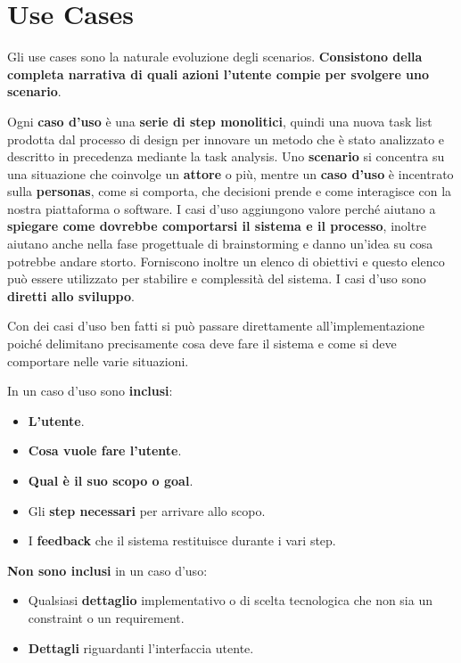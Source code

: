 \documentclass[a4paper,11pt,oneside]{book}
\begin{document}
\section{Use Cases}

Gli use cases sono la naturale evoluzione degli scenarios.
\textbf{Consistono della completa narrativa di quali azioni l'utente compie per svolgere uno scenario}.

Ogni \textbf{caso d'uso} è una \textbf{serie di step monolitici}, quindi una nuova task list prodotta dal processo di design per innovare un metodo che è stato analizzato e descritto in precedenza mediante la task analysis.
Uno \textbf{scenario} si concentra su una situazione che coinvolge un \textbf{attore} o più, mentre un
\textbf{caso d'uso} è incentrato sulla \textbf{personas}, come si comporta, che decisioni prende e come interagisce con la nostra piattaforma o software. I casi d'uso aggiungono valore perché aiutano a \textbf{spiegare come dovrebbe comportarsi
	il sistema e il processo}, inoltre aiutano anche nella fase progettuale di brainstorming e danno un'idea su cosa potrebbe andare storto. Forniscono inoltre un elenco di obiettivi e questo elenco può essere utilizzato per stabilire e complessità del sistema. I casi d'uso sono \textbf{diretti allo sviluppo}.

Con dei casi d'uso ben fatti si può passare direttamente all'implementazione poiché delimitano precisamente cosa deve fare il sistema e come si deve comportare nelle varie situazioni.

In un caso d'uso sono \textbf{inclusi}:

\begin{multicols}{2}
	\begin{itemize}
		\item \textbf{L'utente}.
		\item \textbf{Cosa vuole fare l'utente}.
		\item \textbf{Qual è il suo scopo o goal}.
		\item Gli \textbf{step necessari} per arrivare allo scopo.
		\item I \textbf{feedback} che il sistema restituisce durante i vari step.
	\end{itemize}
\end{multicols}

\textbf{Non sono inclusi} in un caso d'uso:

\begin{multicols}{2}
	\begin{itemize}
		\item Qualsiasi \textbf{dettaglio} implementativo o di scelta tecnologica che non sia un constraint o un requirement.
		\item \textbf{Dettagli} riguardanti l'interfaccia utente.
	\end{itemize}
\end{multicols}
\end{document}
